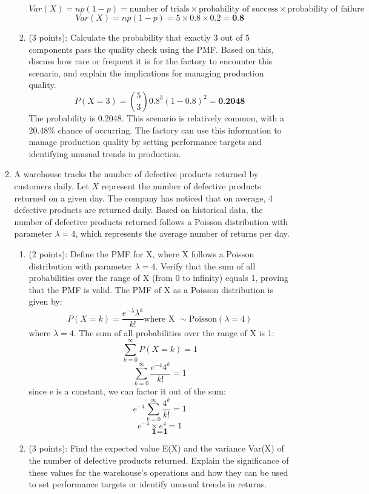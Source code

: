 \documentclass[a3paper,12pt]{article} %
\begin{document}
\begin{enumerate}
\begin{enumerate}
\begin{enumerate}
\[                Var(X) = np(1 - p) = \text{number of trials} \times \text{probability of success} \times \text{probability of failure}
            \]
            \[
                Var(X) = np(1 - p) = 5 \times 0.8 \times 0.2 = \textbf{0.8}
            \]
            \item (3 points): Calculate the probability that exactly 3 out of 5 components pass the quality check using the PMF. Based on this, discuss how rare or frequent it is for the factory to 
            encounter this scenario, and explain the implications for managing production quality.
            \[
            P(X = 3) = \binom{5}{3} 0.8^3 (1 - 0.8)^2 = \textbf{0.2048}
            \]
            The probability is 0.2048. This scenario is relatively common, with a 20.48\% chance of occurring. The factory can use this information to manage production quality by setting performance targets and identifying unusual trends in production.
        \end{enumerate}
        \item A warehouse tracks the number of defective products returned by customers daily. Let \(X\) represent the number of defective products returned on a given day. The company has noticed that on average, 4 defective products are returned daily. Based on historical data, the number of defective products returned follows a Poisson distribution with parameter \(\lambda = 4\), which represents the average number of returns per day.
        \begin{enumerate}
            \item (2 points): Define the PMF for X, where X follows a Poisson distribution with parameter \(\lambda = 4\). Verify that the sum of all probabilities over the range of X (from 0 to infinity) equals 1, proving that the PMF is valid. 
            The PMF of X as a Poisson distribution is given by:
            \[
            P(X = k) = \frac{e^{-\lambda} \lambda^k}{k!} \text{where X } \sim \text{Poisson}(\lambda = 4)
            \]
            where \(\lambda = 4\). The sum of all probabilities over the range of X is 1:
            \[
            \sum_{k = 0}^{\infty} P(X = k) =  1
            \]
            \[
            \sum_{k = 0}^{\infty} \frac{e^{-4} 4^k}{k!} = 1
            \]
            since e is a constant, we can factor it out of the sum:
            \[
            e^{-4} \sum_{k = 0}^{\infty} \frac{4^k}{k!} = 1
            \]
            \[
            e^{-4} \times e^{4} = 1
            \]
            \[
            \textbf{1} = \textbf{1}
            \]
            \item (3 points): Find the expected value E(X) and the variance Var(X) of the number of defective products returned. Explain the significance of these values for the warehouse’s operations and how they can be used to set performance targets or identify unusual trends in returns.

\end{enumerate}
\end{enumerate}
\end{enumerate}
\end{document}
